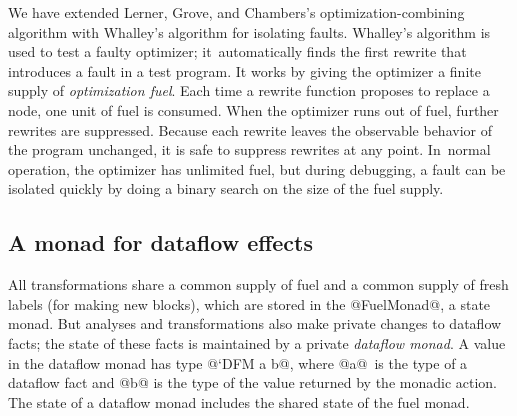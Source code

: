 \documentclass[blockstyle,preprint,natbib,nocopyrightspace]{sigplanconf}
\newcommand\seclabel[1]{\label{sec:#1}}
\begin{document}
\seclabel{vpoiso}
\seclabel{fuel}

We have extended Lerner, Grove, and Chambers's optimization-combining algorithm with
Whalley's \citeyearpar{whalley:isolation} algorithm for isolating
faults.
Whalley's algorithm is used to test a faulty optimizer;
it~automatically
finds the first rewrite that introduces a fault in a test program.
It works by giving the optimizer a finite supply of \emph{optimization fuel}.
Each time a rewrite function proposes to replace a node, one unit of fuel is
consumed.
When the optimizer runs out of fuel, further rewrites are suppressed.
Because each rewrite leaves the observable behavior of the
program unchanged, it is safe to suppress rewrites at
any point.
In~normal operation, the optimizer has unlimited fuel, but during
debugging, a fault can be isolated quickly by doing a binary search on
the size of the fuel supply.


\subsection{A monad for dataflow effects}

All transformations share a common
supply of fuel and a common supply of fresh labels (for making new
blocks), which are stored in the @FuelMonad@, a state monad.
But analyses and transformations also make private changes to dataflow
facts; the state of these facts is maintained by
 a  private \emph{dataflow monad}.
A value in the dataflow monad has type @`DFM a b@, where @a@~is the type of a
dataflow fact and @b@ is the type of the value returned by the monadic action.
The state of a dataflow monad includes the shared state of the
fuel monad.
\end{document}
